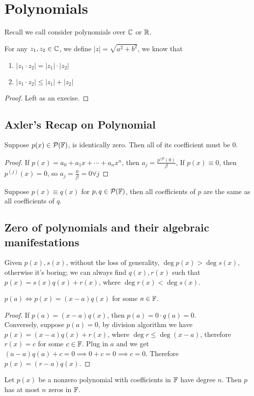 \section{Polynomials}
Recall we call consider polynomials over $\mathbb C$ or $\mathbb R$.
\begin{theorem}
    For any $z_1, z_2 \in \mathbb C$, we define $|z|  = \sqrt{a^2 + b^2}$, we know that 
    \begin{enumerate}
        \item $|z_1 \cdot z_2| = |z_1| \cdot |z_2|$
        \item $|z_1 \cdot z_2| \leq |z_1| + |z_2|$
    \end{enumerate}
\end{theorem}
\begin{proof}
Left as an execise.
\end{proof}
\subsection{Axler's Recap on Polynomial}
\begin{theorem}
    Suppose $p(x) \in \mathcal P(\mathbb F)$, is identically zero. Then all of its coefficient must be $0$. 
\end{theorem}
\begin{proof}
    If $p(x) = a_0 + a_1x + \cdots + a_nx^n$, then $a_j = \frac{p^{(j0}(0)}{j!}$, If $p(x) \equiv 0$, then $p^{(j)}(x) = 0$, so $a_j = \frac{0}{j!} = 0 \forall j$
\end{proof}
\begin{corollary}
    Suppose $p(x) \equiv q(x)$ for $p,q \in \mathcal P(\mathbb F)$, then all coefficients of $p$ are the same as all coefficients of $q$.
\end{corollary}
\subsection{Zero of polynomials and their algebraic manifestations}
\begin{algorithm}
 Given $p(x), s(x)$, without the loss of generality, $\deg p(x) > \deg s(x)$, otherwise it's boring; we can always find $q(x), r(x)$ such that $p(x) = s(x)q(x) + r(x)$, where $\deg r(x) < \deg s(x)$.
\end{algorithm}
\begin{corollary}
    $p(a) \iff p(x) = (x - a)q(x)$ for some $a \in \mathbb F$.
\end{corollary}
\begin{proof}
    If $p(a) = (x-a)q(x)$, then $p(a) = 0 \cdot q(a) = 0$. \\
    Conversely, suppose $p(a) = 0$, by division algorithm we have $p(x) = (x - a)q(x) + r(x)$, where $\deg r \leq \deg (x-a)$, therefore $r(x) = c$ for some $c \in \mathbb F$. Plug in $a$ and we get $(a - a)q(a) + c = 0 \implies 0 + c = 0 \implies c = 0$. Therefore $p(x) = (r-a)q(x)$.
\end{proof}
\begin{theorem}
    Let $p(x)$ be a nonzero polynomial with coefficients in $\mathbb F$ have degree $n$. Then $p$ has at most $n$ zeros in $\mathbb F$.
\end{theorem}

